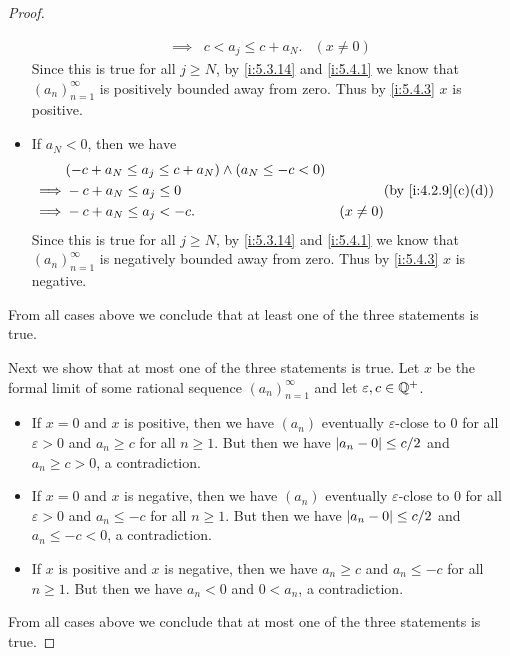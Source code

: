 \begin{proof}
\begin{itemize}
\begin{align*}
            \implies & c < a_j \leq c + a_N.                                   & (x \neq 0)
          \end{align*}
          Since this is true for all \(j \geq N\), by \cref{i:5.3.14} and \cref{i:5.4.1} we know that \((a_n)_{n = 1}^\infty\) is positively bounded away from zero.
          Thus by \cref{i:5.4.3} \(x\) is positive.
    \item If \(a_N < 0\), then we have
          \begin{align*}
                     & (-c + a_N \leq a_j \leq c + a_N) \land (a_N \leq -c < 0)                                  \\
            \implies & -c + a_N \leq a_j \leq 0                                 &            & \by{i:4.2.9}[c,d] \\
            \implies & -c + a_N \leq a_j < -c.                                  & (x \neq 0)
          \end{align*}
          Since this is true for all \(j \geq N\), by \cref{i:5.3.14} and \cref{i:5.4.1} we know that \((a_n)_{n = 1}^\infty\) is negatively bounded away from zero.
          Thus by \cref{i:5.4.3} \(x\) is negative.
  \end{itemize}
  From all cases above we conclude that at least one of the three statements is true.

  Next we show that at most one of the three statements is true.
  Let \(x\) be the formal limit of some rational sequence \((a_n)_{n = 1}^{\infty}\) and let \(\varepsilon, c \in \mathbb{Q}^+\).
  \begin{itemize}
    \item If \(x = 0\) and \(x\) is positive, then we have \((a_n)\) eventually \(\varepsilon\)-close to \(0\) for all \(\varepsilon > 0\) and \(a_n \geq c\) for all \(n \geq 1\).
          But then we have \(\left\lvert a_n - 0\right\rvert \leq c / 2\) and \(a_n \geq c > 0\), a contradiction.
    \item If \(x = 0\) and \(x\) is negative, then we have \((a_n)\) eventually \(\varepsilon\)-close to \(0\) for all \(\varepsilon > 0\) and \(a_n \leq -c\) for all \(n \geq 1\).
          But then we have \(\left\lvert a_n - 0\right\rvert \leq c / 2\) and \(a_n \leq -c < 0\), a contradiction.
    \item If \(x\) is positive and \(x\) is negative, then we have \(a_n \geq c\) and \(a_n \leq -c\) for all \(n \geq 1\).
          But then we have \(a_n < 0\) and \(0 < a_n\), a contradiction.
  \end{itemize}
  From all cases above we conclude that at most one of the three statements is true.


\end{proof}
